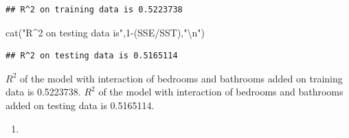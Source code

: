 \documentclass[
]{article}
\newenvironment{Shaded}{\begin{snugshade}}{\end{snugshade}}
\newcommand{\CommentTok}[1]{\textcolor[rgb]{0.56,0.35,0.01}{\textit{#1}}}
\newcommand{\DecValTok}[1]{\textcolor[rgb]{0.00,0.00,0.81}{#1}}
\newcommand{\FunctionTok}[1]{\textcolor[rgb]{0.00,0.00,0.00}{#1}}
\newcommand{\NormalTok}[1]{#1}
\newcommand{\OtherTok}[1]{\textcolor[rgb]{0.56,0.35,0.01}{#1}}
\newcommand{\SpecialCharTok}[1]{\textcolor[rgb]{0.00,0.00,0.00}{#1}}
\newcommand{\StringTok}[1]{\textcolor[rgb]{0.31,0.60,0.02}{#1}}
\providecommand{\tightlist}{%
  \setlength{\itemsep}{0pt}\setlength{\parskip}{0pt}}
\begin{document}
\begin{Shaded}
\end{Shaded}

\begin{verbatim}
## R^2 on training data is 0.5223738
\end{verbatim}

\begin{Shaded}
\begin{Highlighting}[]
\FunctionTok{cat}\NormalTok{(}\StringTok{"R\^{}2 on testing data is"}\NormalTok{,}\DecValTok{1}\SpecialCharTok{{-}}\NormalTok{(SSE}\SpecialCharTok{/}\NormalTok{SST),}\StringTok{"}\SpecialCharTok{\textbackslash{}n}\StringTok{"}\NormalTok{)}
\end{Highlighting}
\end{Shaded}

\begin{verbatim}
## R^2 on testing data is 0.5165114
\end{verbatim}

\(R^2\) of the model with interaction of bedrooms and bathrooms added on
training data is 0.5223738. \(R^2\) of the model with interaction of
bedrooms and bathrooms added on testing data is 0.5165114.

\begin{enumerate}
\def\labelenumi{(\alph{enumi})}
\setcounter{enumi}{1}
\tightlist
\item
\end{enumerate}
\end{document}
